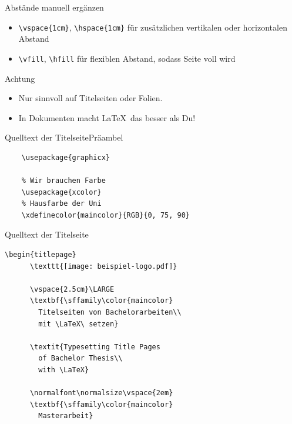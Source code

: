 \begin{Frame}[fragile]{Abstände manuell ergänzen}
  \begin{itemize}
    \item \lstinline-\vspace{1cm}-, \lstinline-\hspace{1cm}-\newline
      für zusätzlichen \alert{v}ertikalen oder \alert{h}orizontalen Abstand
    \item \lstinline-\vfill-, \lstinline-\hfill-\newline
      für flexiblen Abstand, sodass Seite voll wird
  \end{itemize}

  \xxx

  \begin{alertblock}{Achtung}
    \begin{itemize}
      \item Nur sinnvoll auf Titelseiten oder Folien.
      \item In Dokumenten macht \LaTeX\ das besser als Du!
    \end{itemize}
  \end{alertblock}
\end{Frame}

\begin{Frame}[fragile]{Quelltext der Titelseite}{Präambel}
  \begin{lstlisting}[gobble=4]
    % Wir wollen das Logo als Grafik einbinden
    \usepackage{graphicx}
    
    % Wir brauchen Farbe
    \usepackage{xcolor}
    % Hausfarbe der Uni
    \xdefinecolor{maincolor}{RGB}{0, 75, 90}
  \end{lstlisting}
\end{Frame}

\begin{Frame}[fragile]{Quelltext der Titelseite}
  \begin{lstlisting}[gobble=4]
    \begin{titlepage}
      \texttt{[image: beispiel-logo.pdf]}
      
      \vspace{2.5cm}\LARGE
      \textbf{\sffamily\color{maincolor}
        Titelseiten von Bachelorarbeiten\\
        mit \LaTeX\ setzen}

      \textit{Typesetting Title Pages
        of Bachelor Thesis\\
        with \LaTeX}

      \normalfont\normalsize\vspace{2em}
      \textbf{\sffamily\color{maincolor}
        Masterarbeit}
  \end{lstlisting}
\end{Frame}

